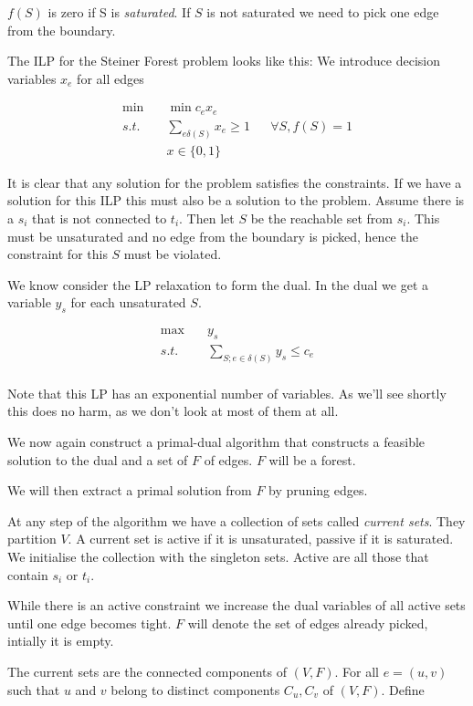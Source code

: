 $f(S)$ is zero if S is \emph{saturated}. If $S$ is not saturated we need to pick one edge from the boundary.

The ILP for the Steiner Forest problem looks like this: We introduce decision variables $x_e$ for all edges

\begin{align*}
\min \quad & \min c_e x_e\\
s.t. \quad & \sum_{e\delta(S)} x_e \geq 1  && \forall S, f(S)=1\\
	& x\in \{0,1\}
\end{align*}

It is clear that any solution for the problem satisfies the constraints. If we have a solution for this ILP this must also be a solution to the problem. Assume there is a $s_i$ that is not connected to $t_i$. Then let $S$ be the reachable set from $s_i$. This must be unsaturated and no edge from the boundary is picked, hence the constraint for this $S$ must be violated.

We know consider the LP relaxation to form the dual. In the dual we get a variable $y_s$ for each unsaturated $S$.

\begin{align*}
\max \quad & y_s\\
s.t.\quad & \sum_{S;e\in \delta(S)} {y_s} \leq c_e\\
\end{align*}

Note that this LP has an exponential number of variables. As we'll see shortly this does no harm, as we don't look at most of them at all.

We now again construct a primal-dual algorithm that constructs a feasible solution to the dual and a set of $F$ of edges. $F$ will be a forest.

We will then extract a primal solution from $F$ by pruning edges.

At any step of the algorithm we have a collection of sets called \emph{current sets}. They partition $V$. A current set is active if it is unsaturated, passive if it is saturated. We initialise the collection with the singleton sets. Active are all those that contain $s_i$ or $t_i$. 

While there is an active constraint we increase the dual variables of all active sets until one edge becomes tight. $F$ will denote the set of edges already picked, intially it is empty.

The current sets are the connected components of $(V,F)$. For all $e=(u,v)$ such that $u$ and $v$ belong to distinct components $C_u,C_v$ of $(V,F)$. Define

